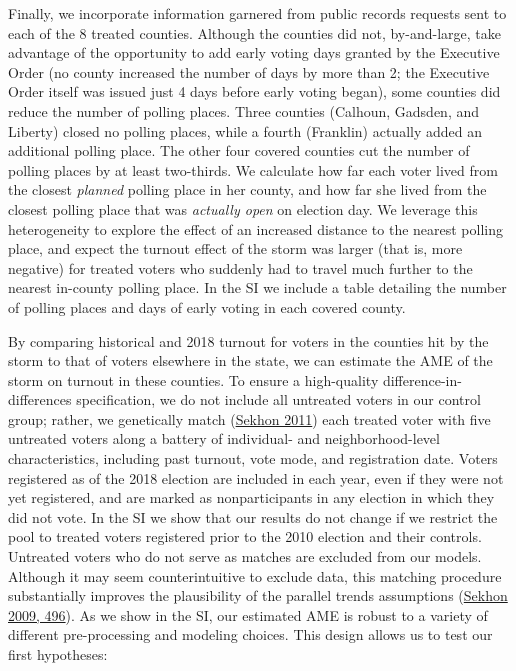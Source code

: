\documentclass[
  12pt,
]{article}
\begin{document}
Finally, we incorporate information garnered from public records requests sent to each of the 8 treated counties. Although the counties did not, by-and-large, take advantage of the opportunity to add early voting days granted by the Executive Order (no county increased the number of days by more than 2; the Executive Order itself was issued just 4 days before early voting began), some counties did reduce the number of polling places. Three counties (Calhoun, Gadsden, and Liberty) closed no polling places, while a fourth (Franklin) actually added an additional polling place. The other four covered counties cut the number of polling places by at least two-thirds. We calculate how far each voter lived from the closest \emph{planned} polling place in her county, and how far she lived from the closest polling place that was \emph{actually open} on election day. We leverage this heterogeneity to explore the effect of an increased distance to the nearest polling place, and expect the turnout effect of the storm was larger (that is, more negative) for treated voters who suddenly had to travel much further to the nearest in-county polling place. In the SI we include a table detailing the number of polling places and days of early voting in each covered county.

By comparing historical and 2018 turnout for voters in the counties hit by the storm to that of voters elsewhere in the state, we can estimate the AME of the storm on turnout in these counties. To ensure a high-quality difference-in-differences specification, we do not include all untreated voters in our control group; rather, we genetically match (\protect\hyperlink{ref-Sekhon2011}{Sekhon 2011}) each treated voter with five untreated voters along a battery of individual- and neighborhood-level characteristics, including past turnout, vote mode, and registration date. Voters registered as of the 2018 election are included in each year, even if they were not yet registered, and are marked as nonparticipants in any election in which they did not vote. In the SI we show that our results do not change if we restrict the pool to treated voters registered prior to the 2010 election and their controls. Untreated voters who do not serve as matches are excluded from our models. Although it may seem counterintuitive to exclude data, this matching procedure substantially improves the plausibility of the parallel trends assumptions (\protect\hyperlink{ref-Sekhon2009}{Sekhon 2009, 496}). As we show in the SI, our estimated AME is robust to a variety of different pre-processing and modeling choices. This design allows us to test our first hypotheses:
\end{document}
